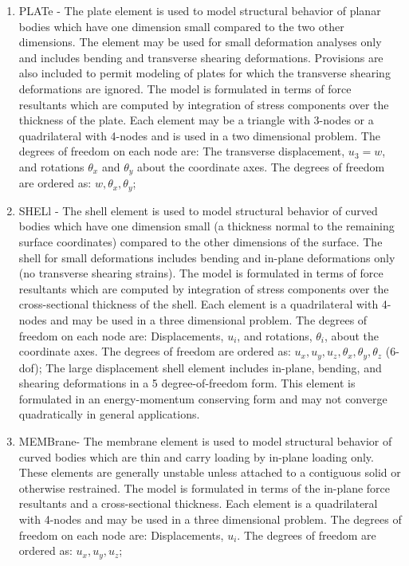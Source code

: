 \begin{enumerate}
\item
PLATe - The plate element is used to model structural behavior of planar
bodies which have one dimension small compared to the two other dimensions.
The element may be used for small deformation analyses only and
includes bending and transverse shearing deformations.
Provisions are also included to permit modeling of plates for which the
transverse shearing deformations are ignored.  The model is formulated in
terms of force resultants which are computed by integration of stress components
over the thickness of the plate.
Each element may be a triangle with 3-nodes or a quadrilateral
with 4-nodes and is used in a two dimensional
problem.  The degrees of freedom on each node are: The transverse displacement,
$u_3 = w$, and rotations $\theta_x$ and $\theta_y$ about the coordinate axes.
The degrees of freedom are ordered as: $w , \theta_x , \theta_y$;

\item
SHELl - The shell element is used to model structural behavior of curved
bodies which have one dimension small (a thickness normal to
the remaining surface coordinates) compared to the other dimensions of
the surface.  The shell for small deformations includes bending and
in-plane deformations only (no transverse shearing strains).
The model is formulated in
terms of force resultants which are computed by integration of stress components
over the cross-sectional thickness of the shell.
Each element is a quadrilateral with 4-nodes
and may be used in a three dimensional
problem.  The degrees of freedom on each node are: Displacements,
$u_i$, and rotations, $\theta_i$, about the coordinate axes.
The degrees of freedom are ordered as:
$u_x , u_y , u_z , \theta_x , \theta_y , \theta_z$ (6-dof);
The large displacement shell element includes in-plane, bending, and shearing
deformations in a 5 degree-of-freedom form.  This element is formulated
in an energy-momentum conserving form and may not converge quadratically in
general applications.

\item
MEMBrane- The membrane element is used to model structural behavior
of curved bodies which are thin and carry loading by in-plane loading
only.  These elements are generally unstable unless attached to a
contiguous solid or otherwise restrained.  The model is formulated in
terms of the in-plane force resultants and a cross-sectional thickness.
Each element is a quadrilateral with 4-nodes
and may be used in a three dimensional
problem.  The degrees of freedom on each node are: Displacements,
$u_i$.  The degrees of freedom are ordered as:
$u_x , u_y , u_z $;


\end{enumerate}
